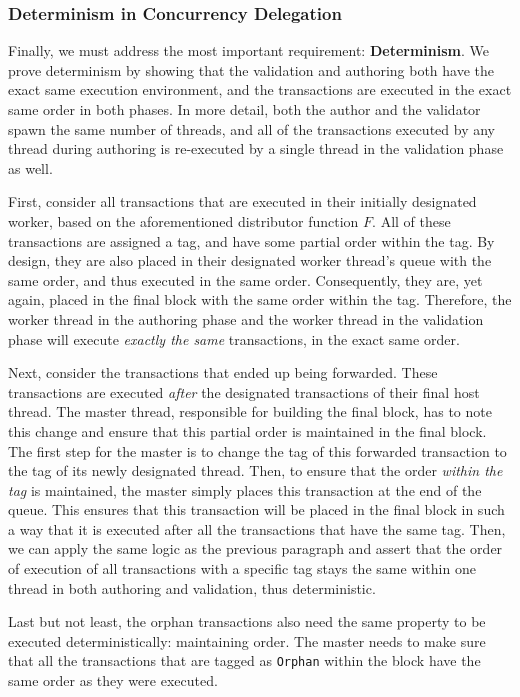 \subsubsection{Determinism in Concurrency Delegation}

Finally, we must address the most important requirement: \textbf{Determinism}. We prove determinism
by showing that the validation and authoring both have the exact same execution environment, and the
transactions are executed in the exact same order in both phases. In more detail, both the author
and the validator spawn the same number of threads, and all of the transactions executed by any
thread during authoring is re-executed by a single thread in the validation phase as well.

First, consider all transactions that are executed in their initially designated worker, based on
the aforementioned distributor function $F$. All of these transactions are assigned a tag, and have
some partial order within the tag. By design, they are also placed in their designated worker
thread's queue with the same order, and thus executed in the same order. Consequently, they are, yet
again, placed in the final block with the same order within the tag. Therefore, the worker thread in
the authoring phase and the worker thread in the validation phase will execute \textit{exactly the
same} transactions, in the exact same order.

Next, consider the transactions that ended up being forwarded. These transactions are executed
\textit{after} the designated transactions of their final host thread. The master thread,
responsible for building the final block, has to note this change and ensure that this partial order
is maintained in the final block. The first step for the master is to change the tag of this
forwarded transaction to the tag of its newly designated thread. Then, to ensure that the order
\textit{within the tag} is maintained, the master simply places this transaction at the end of the
queue. This ensures that this transaction will be placed in the final block in such a way that it is
executed after all the transactions that have the same tag. Then, we can apply the same logic as the
previous paragraph and assert that the order of execution of all transactions with a specific tag
stays the same within one thread in both authoring and validation, thus deterministic.

Last but not least, the orphan transactions also need the same property to be executed
deterministically: maintaining order. The master needs to make sure that all the transactions that
are tagged as \texttt{Orphan} within the block have the same order as they were executed.

